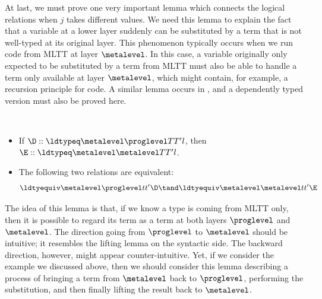 At last, we must prove one very important lemma which connects the logical relations
when $j$ takes different values. %
We need this lemma to explain the fact that a variable at a lower layer suddenly can
be substituted by a term that is not well-typed at its original layer. %
This phenomenon typically occurs when we run code from MLTT at layer $\metalevel$. %
In this case, a variable originally only expected to be substituted by a term from
MLTT must also be able to handle a term only available at layer $\metalevel$, which might
contain, for example, a recursion principle for code. %
A similar lemma occurs in , and a dependently typed version
must also be proved here.
\begin{lemma} $ $
  \begin{itemize}
  \item If $\D :: \ldtypeq \metalevel \proglevel T{T'}l$, then $\E :: \ldtypeq \metalevel \metalevel T{T'}l$.
  \item The following two relations are equivalent:
    \[
      \ldtyequiv \metalevel \proglevel t{t'}\D \tand \ldtyequiv \metalevel \metalevel t{t'}\E
    \]
  \end{itemize}
\end{lemma}
The idea of this lemma is that, if we know a type is coming from MLTT only, then it is
possible to regard its term as a term at both layers $\proglevel$ and $\metalevel$. %
The direction going from $\proglevel$ to $\metalevel$ should be intuitive; it resembles the lifting
lemma on the syntactic side. %
The backward direction, however, might appear counter-intuitive. %
Yet, if we consider the example we discussed above, then we should consider this lemma
describing a process of bringing a term from $\metalevel$ back to $\proglevel$, performing the
substitution, and then finally lifting the result back to $\metalevel$. 
